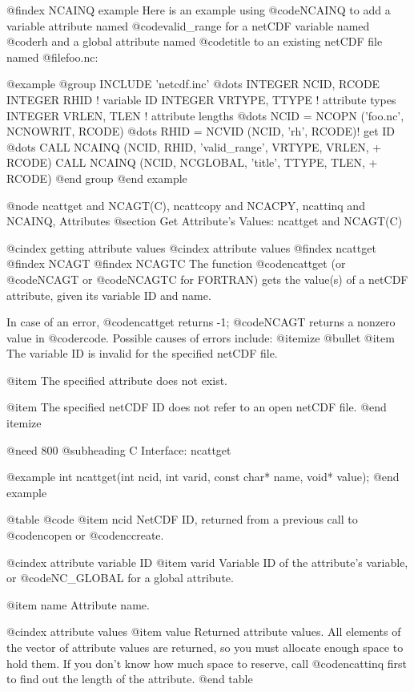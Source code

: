 {@findex NCAINQ example
Here is an example using @code{NCAINQ} to add a variable attribute
named @code{valid_range} for a netCDF variable named @code{rh} and a
global attribute named @code{title} to an existing netCDF file named
@file{foo.nc}:

@example
@group
      INCLUDE 'netcdf.inc'
         @dots{}
      INTEGER  NCID, RCODE
      INTEGER  RHID               ! variable ID
      INTEGER  VRTYPE, TTYPE      ! attribute types
      INTEGER  VRLEN, TLEN        ! attribute lengths
         @dots{}
      NCID = NCOPN ('foo.nc', NCNOWRIT, RCODE)
         @dots{}
      RHID = NCVID (NCID, 'rh', RCODE)! get ID
         @dots{}
      CALL NCAINQ (NCID, RHID, 'valid_range', VRTYPE, VRLEN,
     +             RCODE)
      CALL NCAINQ (NCID, NCGLOBAL, 'title', TTYPE, TLEN,
     +             RCODE)
@end group
@end example

@node ncattget and NCAGT(C), ncattcopy and NCACPY, ncattinq and NCAINQ, Attributes
@section Get Attribute's Values:  ncattget and NCAGT(C)

@cindex getting attribute values
@cindex attribute values
@findex ncattget
@findex NCAGT
@findex NCAGTC
The function @code{ncattget} (or @code{NCAGT} or @code{NCAGTC} for
FORTRAN) gets the value(s) of a netCDF attribute, given its
variable ID and name.

In case of an error, @code{ncattget} returns -1; @code{NCAGT} returns a
nonzero value in @code{rcode}.  Possible causes of errors include:
@itemize @bullet
@item
The variable ID is invalid for the specified netCDF file.

@item
The specified attribute does not exist.

@item
The specified netCDF ID does not refer to an open netCDF file.
@end itemize

@need 800
@subheading C Interface:  ncattget

@example
int ncattget(int ncid, int varid, const char* name, void* value);
@end example

@table @code
@item ncid
NetCDF ID, returned from a previous call to @code{ncopen} or @code{nccreate}.

@cindex attribute variable ID
@item varid
Variable ID of the attribute's variable, or @code{NC_GLOBAL} for a
global attribute.

@item name
Attribute name.

@cindex attribute values
@item value
Returned attribute values.  All elements of the vector of attribute
values are returned, so you must allocate enough space to hold
them.  If you don't know how much space to reserve, call @code{ncattinq}
first to find out the length of the attribute.
@end table

}
